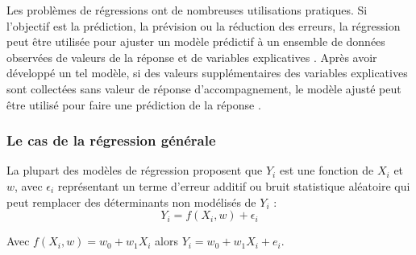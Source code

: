 	
	Les problèmes de régressions ont de nombreuses utilisations pratiques. Si l'objectif est la prédiction, la prévision ou la réduction des erreurs, la régression peut être utilisée pour ajuster un modèle prédictif à un ensemble de données observées de valeurs de la réponse et de variables explicatives \cite{darlington2016regression}. Après avoir développé un tel modèle, si des valeurs supplémentaires des variables explicatives sont collectées sans valeur de réponse d'accompagnement, le modèle ajusté peut être utilisé pour faire une prédiction de la réponse \cite{harrell2001regression}.
	
	
	\subsubsection{Le cas de la régression générale}
	La plupart des modèles de régression proposent que $Y_{i}$ est une fonction de $X_{i}$ et $w$, avec $\epsilon_{i}$ représentant un terme d'erreur additif ou bruit statistique aléatoire qui peut remplacer des déterminants non modélisés de $Y_{i}$ :
	\begin{equation}
	{\displaystyle Y_{i}=f(X_{i},w )+\epsilon_{i}}
	\end{equation}
	
	Avec ${\displaystyle f(X_{i},w )= w_{0}+ w_{1}X_{i}}$ alors ${\displaystyle Y_{i}= w_{0}+ w_{1}X_{i}+e_{i}}$.
	
